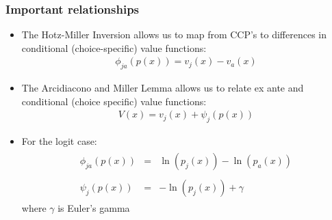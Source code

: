 \documentclass[xcolor=pdftex,dvipsnames,table,mathserif]{beamer}
\begin{document}
\begin{frame}
\frametitle{Important relationships}
\begin{itemize}
\item The Hotz-Miller Inversion allows us to map from CCP's to differences
in conditional (choice-specific) value functions:
\begin{eqnarray*}
\phi_{ja}\left(p\left(x\right)\right)=v_{j}\left(x\right)-v_{a}\left(x\right)
\end{eqnarray*}
\medskip
\item The Arcidiacono and Miller Lemma allows us to relate ex ante and conditional (choice specific)
value functions: 
\begin{eqnarray*}
V\left(x\right)=v_{j}\left(x\right)+\psi_{j}\left(p\left(x\right)\right)
\end{eqnarray*}
\item For the logit case:
\begin{eqnarray*}
\begin{array}{ccl}
\phi_{ja}\left(p\left(x\right)\right) & = & \ln\left(p_{j}\left(x\right)\right)-\ln\left(p_{a}\left(x\right)\right)\\
\\
\psi_{j}\left(p\left(x\right)\right) & = & -\ln\left(p_{j}\left(x\right)\right)+\gamma
\end{array}
\end{eqnarray*}
where $\gamma$ is Euler's gamma
\end{itemize}
\end{frame}



\end{document}
